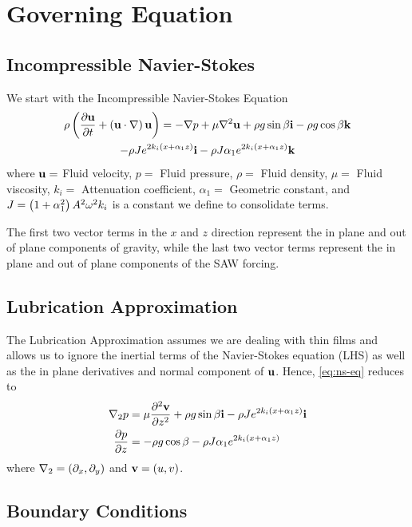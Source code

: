 \section{Governing Equation}
\subsection{Incompressible Navier-Stokes}
\begin{frame}
    We start with the Incompressible Navier-Stokes Equation
    \begin{multline}
        \rho \left( \frac{\partial \textbf{u}}{\partial t} + \left( \textbf{u} \cdot \nabla \right)\textbf{u} \right) = -\nabla p
        + \mu \nabla^2 \textbf{u} + \rho g \sin \beta \textbf{i} - \rho g \cos \beta \textbf{k} \\
        - \rho J e^{2k_i \left( x + \alpha_1 z \right)} \textbf{i} - \rho J \alpha_1 e^{2k_i \left( x + \alpha_1 z \right)} \textbf{k}
        \label{eq:ns-eq}
    \end{multline}
    where $\textbf{u} =$ Fluid velocity, $p =$ Fluid pressure, $\rho =$ Fluid density, $\mu =$ Fluid viscosity, 
    $k_i =$  Attenuation coefficient, $\alpha_1 =$ Geometric constant, and $J = \left( 1 + \alpha_1^2 \right)A^2\omega^2 k_i$
    is a constant we define to consolidate terms. 

    The first two vector terms in the $x$ and $z$ direction represent the in plane and out of plane 
    components of gravity, while the last two vector terms represent the in plane and out of plane 
    components of the SAW forcing. 
\end{frame}
\subsection{Lubrication Approximation}
\begin{frame}
    The Lubrication Approximation assumes we are dealing with thin films
    and allows us to ignore the inertial terms of the Navier-Stokes equation (LHS) as well as the in plane
    derivatives and normal component of $\textbf{u}$. Hence, \cref{eq:ns-eq} reduces to 
    \begin{equation}
        \begin{aligned}
            \nabla_2 p &= \mu \frac{\partial^2 \textbf{v}}{\partial z^2} + \rho g \sin\beta \textbf{i} - \rho Je^{2k_i \left( x + \alpha_1 z \right)}\textbf{i}\\
            \frac{\partial p}{\partial z} &= -\rho g \cos\beta - \rho J\alpha_1 e^{2k_i \left( x + \alpha_1 z \right)}
        \end{aligned}
        \label{eq:lub_approx}
    \end{equation}
    where $\nabla_2 = \left( \partial_x, \partial_y \right)$ and $\textbf{v} = \left( u, v \right)$. 
\end{frame}
\subsection{Boundary Conditions}
\begin{frame}

\end{frame}